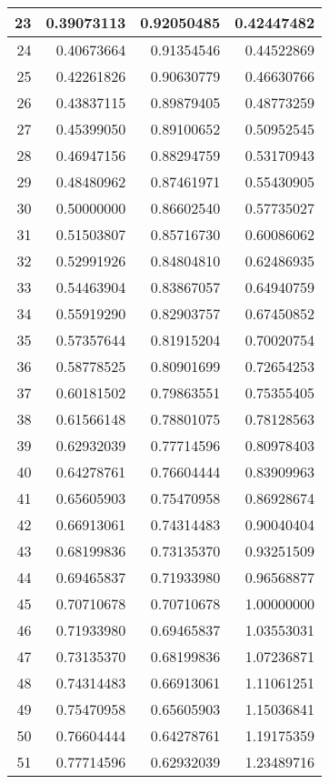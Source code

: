 \documentclass{jsarticle}
\begin{document}
\begin{longtable}{|r|r|r|r|}
	23	&0.39073113	&0.92050485	&0.42447482	\\ \hline
	24	&0.40673664	&0.91354546	&0.44522869	\\ \hline
	25	&0.42261826	&0.90630779	&0.46630766	\\ \hline
	26	&0.43837115	&0.89879405	&0.48773259	\\ \hline
	27	&0.45399050	&0.89100652	&0.50952545	\\ \hline
	28	&0.46947156	&0.88294759	&0.53170943	\\ \hline
	29	&0.48480962	&0.87461971	&0.55430905	\\ \hline
	30	&0.50000000	&0.86602540	&0.57735027	\\ \hline
	31	&0.51503807	&0.85716730	&0.60086062	\\ \hline
	32	&0.52991926	&0.84804810	&0.62486935	\\ \hline
	33	&0.54463904	&0.83867057	&0.64940759	\\ \hline
	34	&0.55919290	&0.82903757	&0.67450852	\\ \hline
	35	&0.57357644	&0.81915204	&0.70020754	\\ \hline
	36	&0.58778525	&0.80901699	&0.72654253	\\ \hline
	37	&0.60181502	&0.79863551	&0.75355405	\\ \hline
	38	&0.61566148	&0.78801075	&0.78128563	\\ \hline
	39	&0.62932039	&0.77714596	&0.80978403	\\ \hline
	40	&0.64278761	&0.76604444	&0.83909963	\\ \hline
	41	&0.65605903	&0.75470958	&0.86928674	\\ \hline
	42	&0.66913061	&0.74314483	&0.90040404	\\ \hline
	43	&0.68199836	&0.73135370	&0.93251509	\\ \hline
	44	&0.69465837	&0.71933980	&0.96568877	\\ \hline
	45	&0.70710678	&0.70710678	&1.00000000	\\ \hline
	46	&0.71933980	&0.69465837	&1.03553031	\\ \hline
	47	&0.73135370	&0.68199836	&1.07236871	\\ \hline
	48	&0.74314483	&0.66913061	&1.11061251	\\ \hline
	49	&0.75470958	&0.65605903	&1.15036841	\\ \hline
	50	&0.76604444	&0.64278761	&1.19175359	\\ \hline
	51	&0.77714596	&0.62932039	&1.23489716	\\ \hline

\end{longtable}
\end{document}
